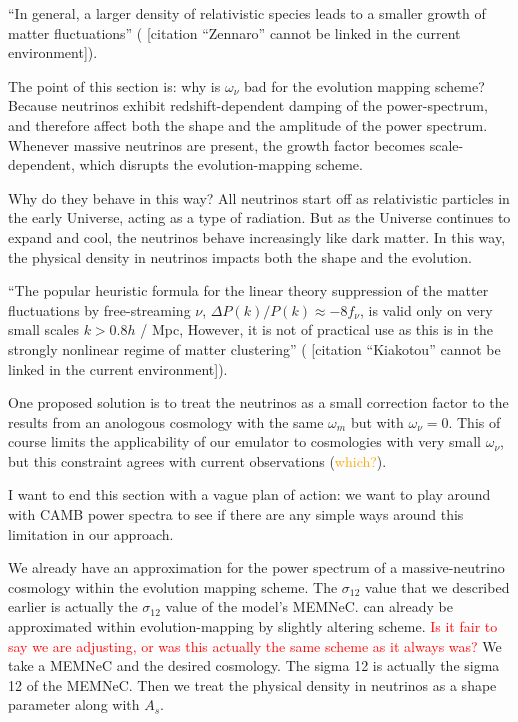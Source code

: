\documentclass[11pt]{article}
\newcommand{\cbib}[1]
{\IfFileExists{biblatex.sty}
{\cite{#1}}
{[citation ``#1'' cannot be linked in the current environment]}}
\begin{document}
``In general, a larger density of relativistic species leads to a smaller
growth of matter fluctuations'' (\cbib{Zennaro}).

The point of this section is: why is $\omega_\nu$ bad for the
evolution mapping scheme? Because neutrinos exhibit redshift-dependent
damping of the power-spectrum, and therefore affect both the shape and the
amplitude of the power spectrum. Whenever massive neutrinos are present,
the growth factor becomes scale-dependent, which disrupts the
evolution-mapping scheme.

Why do they behave in this way? All neutrinos start off as
relativistic particles in the early Universe, acting as a type of radiation.
But as the Universe continues to expand and cool, the neutrinos behave
increasingly like dark matter.
In this way, the physical density in neutrinos impacts both the shape and the
evolution.

``The popular heuristic formula for the linear theory suppression of the matter
fluctuations by free-streaming $\nu$, $\Delta P(k) / P(k) \approx -8 f_\nu$, is
valid only on very small scales $k > 0.8 h$ / Mpc, However, it is not of
practical use as this is in the strongly nonlinear regime of matter
clustering'' (\cbib{Kiakotou}).

One proposed solution is to treat the neutrinos as a small correction factor
to the results from an anologous cosmology with the same $\omega_m$ but with
$\omega_\nu = 0$. This of course limits the applicability of our emulator to
cosmologies with very small $\omega_\nu$, but this constraint agrees with
current observations (\textcolor{orange}{which?}).

I want to end this section with a vague plan of action: we want to play around with CAMB power spectra to see if there are any simple ways around this limitation in our approach.


We already have an approximation for the power spectrum of a massive-neutrino cosmology within the evolution mapping scheme. The $\sigma_{12}$ value that we described earlier is actually the $\sigma_{12}$ value of the model's MEMNeC. can already be approximated within evolution-mapping by slightly altering scheme. \textcolor{red}{Is it fair to say we are adjusting, or was this actually the same scheme as it always was?} We take a MEMNeC and the desired cosmology. The sigma 12 is actually the sigma 12 of the MEMNeC. Then we treat the physical density in neutrinos as a shape parameter along with $A_s$.
\end{document}
